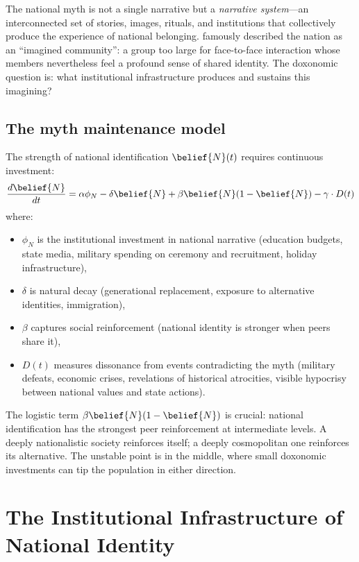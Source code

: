 The national myth is not a single narrative but a \emph{narrative system}---an interconnected set of stories, images, rituals, and institutions that collectively produce the experience of national belonging.
\textcite{anderson2006} famously described the nation as an ``imagined community'': a group too large for face-to-face interaction whose members nevertheless feel a profound sense of shared identity.
The doxonomic question is: what institutional infrastructure produces and sustains this imagining?

\subsection{The myth maintenance model}

\begin{model}
\label{mod:myth-maintenance}
The strength of national identification $\belief{N}(t)$ requires continuous investment:
\[
  \frac{d\belief{N}}{dt} = \alpha \phi_N - \delta \belief{N} + \beta \belief{N}(1 - \belief{N}) - \gamma \cdot D(t)
\]
where:
\begin{itemize}[nosep]
  \item $\phi_N$ is the institutional investment in national narrative (education budgets, state media, military spending on ceremony and recruitment, holiday infrastructure),
  \item $\delta$ is natural decay (generational replacement, exposure to alternative identities, immigration),
  \item $\beta$ captures social reinforcement (national identity is stronger when peers share it),
  \item $D(t)$ measures dissonance from events contradicting the myth (military defeats, economic crises, revelations of historical atrocities, visible hypocrisy between national values and state actions).
\end{itemize}
\end{model}

The logistic term $\beta \belief{N}(1 - \belief{N})$ is crucial: national identification has the strongest peer reinforcement at intermediate levels.
A deeply nationalistic society reinforces itself; a deeply cosmopolitan one reinforces its alternative.
The unstable point is in the middle, where small doxonomic investments can tip the population in either direction.

\section{The Institutional Infrastructure of National Identity}
\label{sec:ch27-infrastructure}

